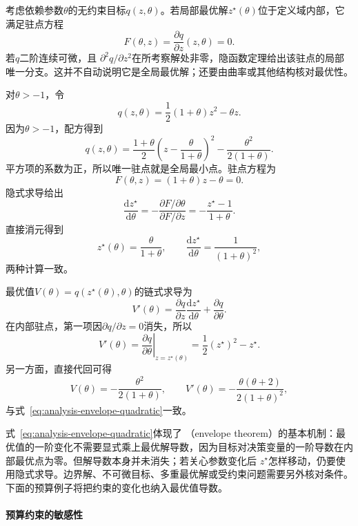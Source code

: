 考虑依赖参数$\theta$的无约束目标$q(z,\theta)$。若局部最优解$z^\star(\theta)$位于定义域内部，它满足驻点方程
\[   F(\theta,z)   =   \frac{\partial q}{\partial z}(z,\theta)   =   0. \]
若$q$二阶连续可微，且 $\partial^2q/\partial z^2$在所考察解处非零，隐函数定理给出该驻点的局部唯一分支。这并不自动说明它是全局最优解；还要由曲率或其他结构核对最优性。
\begin{example}[参数二次目标中的解导数与包络导数]
\label{ex:analysis-parametric-quadratic}
对$\theta>-1$，令
\[   q(z,\theta)   =   \frac12(1+\theta)z^2-\theta z. \]
因为$\theta>-1$，配方得到
\[
  q(z,\theta)=\frac{1+\theta}{2}
  \left(z-\frac{\theta}{1+\theta}\right)^2
  -\frac{\theta^2}{2(1+\theta)}.
\]
平方项的系数为正，所以唯一驻点就是全局最小点。驻点方程为
\[   F(\theta,z)=(1+\theta)z-\theta=0. \]
隐式求导给出
\[   \frac{\mathrm{d}z^\star}{\mathrm{d}\theta}   =   -\frac{\partial F/\partial\theta}{\partial F/\partial z}   =   -\frac{z^\star-1}{1+\theta}. \]
直接消元得到
\[   z^\star(\theta)=\frac{\theta}{1+\theta},   \qquad   \frac{\mathrm{d}z^\star}{\mathrm{d}\theta}   =   \frac{1}{(1+\theta)^2}, \]
两种计算一致。

最优值$V(\theta)=q(z^\star(\theta),\theta)$的链式求导为
\[   V'(\theta)   =   \frac{\partial q}{\partial z}   \frac{\mathrm{d}z^\star}{\mathrm{d}\theta}   +   \frac{\partial q}{\partial\theta}. \]
在内部驻点，第一项因$\partial q/\partial z=0$消失，所以
\begin{equation}
  V'(\theta)
  =
  \left.
  \frac{\partial q}{\partial\theta}
  \right|_{z=z^\star(\theta)}
  =
  \frac12(z^\star)^2-z^\star.
\label{eq:analysis-envelope-quadratic}
\end{equation}
另一方面，直接代回可得
\[   V(\theta)=-\frac{\theta^2}{2(1+\theta)},   \qquad   V'(\theta)   =   -\frac{\theta(\theta+2)}{2(1+\theta)^2}, \]
与式~\eqref{eq:analysis-envelope-quadratic}一致。
\end{example}

式~\eqref{eq:analysis-envelope-quadratic}体现了
（envelope theorem）的基本机制：最优值的一阶变化不需要显式乘上最优解导数，因为目标对决策变量的一阶导数在内部最优点为零。但解导数本身并未消失；若关心参数变化后 $z^\star$怎样移动，仍要使用隐式求导。边界解、不可微目标、多重最优解或受约束问题需要另外核对条件。下面的预算例子将把约束的变化也纳入最优值导数。


\paragraph{预算约束的敏感性}

